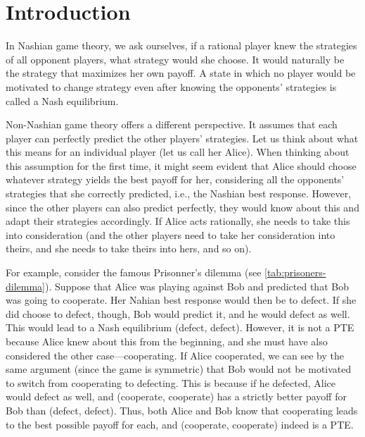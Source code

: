 \chapter{Introduction}
In Nashian game theory, we ask ourselves, if a rational player knew the strategies of all opponent players, what strategy would she choose.
It would naturally be the strategy that maximizes her own payoff.
A state in which no player would be motivated to change strategy even after knowing the opponents' strategies is called a Nash equilibrium.

Non-Nashian game theory offers a different perspective.
It assumes that each player can perfectly predict the other players' strategies.
Let us think about what this means for an individual player (let us call her Alice).
When thinking about this assumption for the first time, it might seem evident that Alice should choose whatever strategy yields the best payoff for her, considering all the opponents' strategies that she correctly predicted, i.e., the Nashian best response.
However, since the other players can also predict perfectly, they would know about this and adapt their strategies accordingly.
If Alice acts rationally, she needs to take this into consideration (and the other players need to take her consideration into theirs, and she needs to take theirs into hers, and so on).

For example, consider the famous Prisonner's dilemma (see \autoref{tab:prisoners-dilemma}).
Suppose that Alice was playing against Bob and predicted that Bob was going to cooperate.
Her Nahian best response would then be to defect.
If she did choose to defect, though, Bob would predict it, and he would defect as well.
This would lead to a Nash equilibrium (defect, defect).
However, it is not a PTE because Alice knew about this from the beginning, and she must have also considered the other case---cooperating.
If Alice cooperated, we can see by the same argument (since the game is symmetric) that Bob would not be motivated to switch from cooperating to defecting.
This is because if he defected, Alice would defect as well, and (cooperate, cooperate) has a strictly better payoff for Bob than (defect, defect).
Thus, both Alice and Bob know that cooperating leads to the best possible payoff for each, and (cooperate, cooperate) indeed is a PTE.

